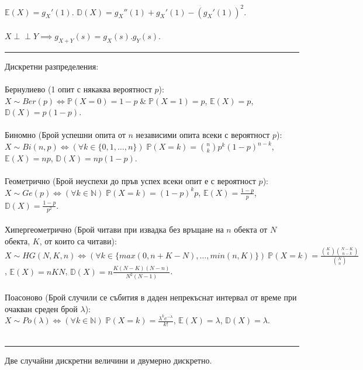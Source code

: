 \documentclass[10pt, a4paper]{article}
\newcommand{\prob}{\mathbb{P}}
\newcommand{\expect}{\mathbb{E}}
\newcommand{\disp}{\mathbb{D}}
\newcommand{\indep}{\perp \!\!\! \perp}
\begin{document}
\(\expect(X) = g_X'(1)\). \quad \(\disp(X) = g_X''(1) + g_X'(1) - (g_X'(1))^2\).
\\
\\
\(X \indep Y \implies g_{X + Y}(s) = g_X(s).g_Y(s)\).
\\
\hrule
\vspace*{3mm}
Дискретни разпределения:
\\
\\
Бернулиево (1 опит с някаква вероятност \(p\)):
\(X \sim Ber(p) \iff \prob(X = 0) = 1 - p \; \& \; \prob(X = 1) = p\), \;
\(\expect(X) = p\), \; \(\disp(X) = p(1 - p)\).
\\
\\
Биномно (Брой успешни опита от \(n\) независими опита всеки с вероятност \(p\)):\\
\(X \sim Bi(n, p) \iff (\forall k \in \{0, 1, \dots, n\})\;\prob(X = k) = \binom{n}{k}p^k(1 -p)^{n - k}\), \quad
\(\expect(X) = np\), \quad \(\disp(X) = np(1 - p)\).
\\
\\
Геометрично (Брой неуспехи до пръв успех всеки опит е с вероятност \(p\)):\\
\(X \sim Ge(p) \iff (\forall k \in \mathbb{N})\;\prob(X = k) = (1 -p)^k p\), \quad
\(\expect(X) = \displaystyle\frac{1 - p}{p}\), \quad
\(\disp(X) = \displaystyle\frac{1 - p}{p^2}\).
\\
\\
Хипергеометрично (Брой читави при извадка без връщане на \(n\) обекта от \(N\) обекта, \(K\), от които са читави):
\(X \sim HG(N, K, n) \iff (\forall k \in \{max(0, n + K - N), \dots, min(n, K)\})\
\prob(X = k) = \displaystyle\frac{\binom{K}{k}\binom{N - K}{n - k}}{\binom{N}{n}}\), \quad
\(\expect(X) = n\displaystyle{K}{N}\), \quad
\(\disp(X) = n\displaystyle\frac{K(N - K)(N - n)}{N^2(N - 1)}\).
\\
\\
Поасоново (Брой случили се събития в даден непрекъснат интервал от време при очакван среден брой \(\lambda\)): \\
\(X \sim Po(\lambda) \iff (\forall k \in \mathbb{N}) \; \prob(X = k) = \displaystyle\frac{\lambda^k e^{-\lambda}}{k!} \), \quad
\(\expect(X) = \lambda\), \quad \(\disp(X) = \lambda\). 
\\
\\
\hrule
\vspace*{3mm}
Две случайни дискретни величини и двумерно дискретно.
\\
\vspace*{1mm}
\\
\end{document}
